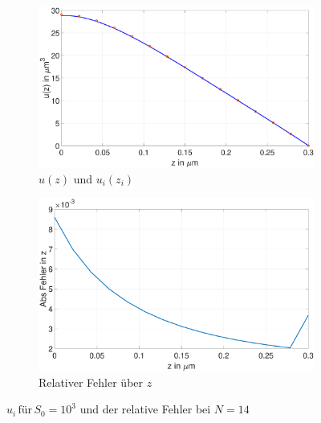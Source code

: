 \begin{figure}[h]
	\begin{subfigure}[b]{0.5\textwidth}
		\includegraphics[width=\textwidth]{figures/station_gl_2_2/S1}
		\caption{$u(z)$ und $u_{i}(z_i)$}
	\end{subfigure}
	\hfill
	\begin{subfigure}[b]{0.5\textwidth}
		\includegraphics[width=1\linewidth]{figures/station_gl_2_2/S1_fehler}
		\caption{Relativer Fehler über $z$}
	\end{subfigure}
	\caption{$u_i \,\text{für} \, S_0=10^3$ und der relative Fehler bei $N=14$ }
\end{figure}
